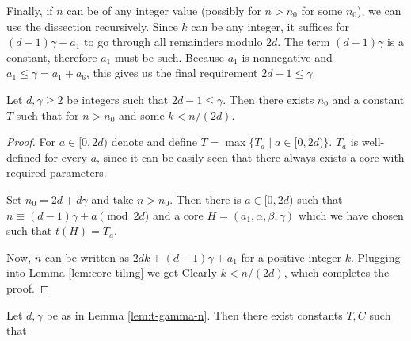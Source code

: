 Finally, if $n$ can be of any integer value (possibly for $n > n_0$ for some $n_0$), we can use the dissection recursively. Since $k$ can be any integer, it suffices for $(d-1)\gamma + a_1$ to go through all remainders modulo $2d$. The term $(d-1)\gamma$ is a constant, therefore $a_1$ must be such. Because $a_1$ is nonnegative and $a_1 \leq \gamma = a_1 + a_6$, this gives us the final requirement $2d-1 \leq \gamma$.

\begin{lem}
\label{lem:t-gamma-n}

Let $d,\gamma \geq 2$ be integers such that $2d-1 \leq \gamma$. Then there exists $n_0$ and a constant $T$ such that
%
for $n > n_0$ and some $k < n/(2d)$.
\end{lem}
\begin{proof}
For $a \in [0,2d)$ denote
%
and define $T = \max \{T_a \mid a \in [0,2d)\}$. $T_a$ is well-defined for every $a$, since it can be easily seen that there always exists a core with required parameters.

Set $n_0 = 2d+d\gamma$ and take $n > n_0$. Then there is $a \in [0,2d)$ such that $n \equiv (d-1)\gamma + a \pmod{2d}$ and a core $H=(a_1,\alpha,\beta,\gamma)$ which we have chosen such that $t(H) = T_a$.

Now, $n$ can be written as $2dk + (d-1)\gamma + a_1$ for a positive integer $k$. Plugging into Lemma \ref{lem:core-tiling} we get
%
Clearly $k < n/(2d)$, which completes the proof.
\end{proof}

\begin{cor}
\label{cor:log-t-gamma-n}
Let $d,\gamma$ be as in Lemma \ref{lem:t-gamma-n}. Then there exist constants $T,C$ such that
%
\end{cor}%


